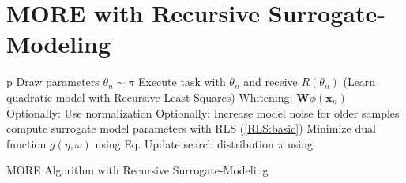 \section{MORE with Recursive Surrogate-Modeling}
\begin{algorithm}[H]
\DontPrintSemicolon
\SetAlgoLined
{}

{
p  {
    Draw parameters $\theta_n \sim \pi$\;
    Execute task with $\theta_n$ and receive $R(\theta_n)$\;
  }
  \Begin(Learn quadratic model with Recursive Least Squares)
  {
    {
      Whitening: $\mathbf{W}\phi(\mathbf{x}_n)$\;
      Optionally: Use normalization\;
      Optionally: Increase model noise for older samples\;      
      compute surrogate model parameters with RLS (\ref{RLS:basic})\;
    }
  }
  Minimize dual function $g(\eta, \omega)$ using Eq.\;
  Update search distribution $\pi$ using \;
}
\caption{MORE Algorithm with Recursive Surrogate-Modeling}
\end{algorithm}

%
%
%
%
%
%